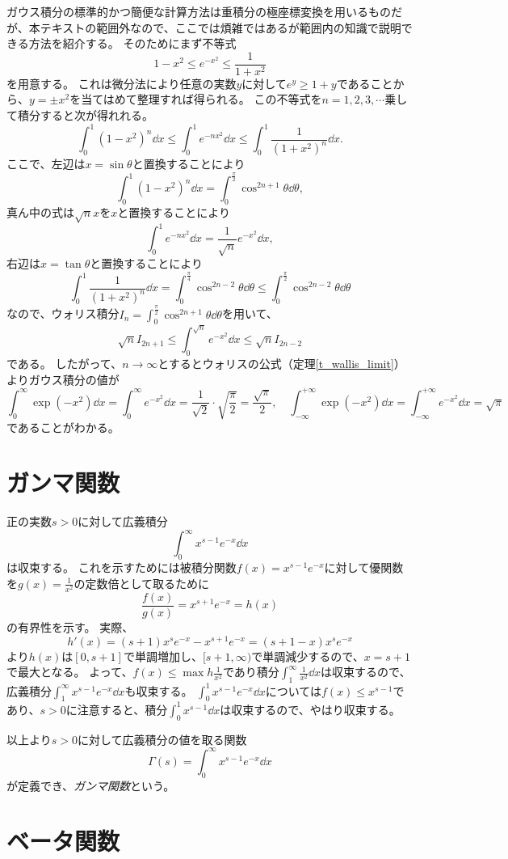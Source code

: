 ガウス積分の標準的かつ簡便な計算方法は重積分の極座標変換を用いるものだが、本テキストの範囲外なので、ここでは煩雑ではあるが範囲内の知識で説明できる方法を紹介する。
そのためにまず不等式
$$
1-x^2 \le e^{-x^2} \le \frac{1}{1+x^2}
$$
を用意する。
これは微分法により任意の実数$y$に対して$e^y \ge 1+y$であることから、$y = \pm x^2$を当てはめて整理すれば得られる。
この不等式を$n = 1, 2, 3, \cdots$乗して積分すると次が得れれる。
$$
\int_0^1 (1-x^2)^n\dd{x} \le \int_0^1 e^{-n x^2}\dd{x} \le \int_0^1 \frac{1}{(1+x^2)^n}\dd{x}.
$$
ここで、左辺は$x = \sin\theta$と置換することにより
$$
\int_0^1 (1-x^2)^n\dd{x} = \int_0^{\frac{\pi}{2}} \cos^{2 n+1}\theta\dd{\theta},
$$
真ん中の式は$\sqrt{n}x$を$x$と置換することにより
$$
\int_0^1 e^{-n x^2}\dd{x} = \frac{1}{\sqrt{n}} e^{-x^2}\dd{x},
$$
右辺は$x = \tan\theta$と置換することにより
$$
\int_0^1 \frac{1}{(1+x^2)^n}\dd{x} = \int_0^{\frac{\pi}{4}} \cos^{2 n-2}\theta\dd{\theta} \le \int_0^{\frac{\pi}{2}} \cos^{2 n-2}\theta\dd{\theta}
$$
なので、ウォリス積分$I_n = \int_0^{\frac{\pi}{2}} \cos^{2 n+1}\theta\dd{\theta}$を用いて、
$$
\sqrt{n}I_{2 n+1} \le \int_0^{\sqrt{n}} e^{-x^2}\dd{x} \le \sqrt{n}I_{2 n-2}
$$
である。
したがって、$n \to \infty$とするとウォリスの公式（定理\ref{t_wallis_limit}）よりガウス積分の値が
$$
\int_0^\infty \exp(-x^2)\dd{x} = \int_0^\infty e^{-x^2}\dd{x} = \frac{1}{\sqrt{2}}\cdot\sqrt{\frac{\pi}{2}} = \frac{\sqrt{\pi}}{2},
\quad \int_{-\infty}^{+\infty} \exp(-x^2)\dd{x} = \int_{-\infty}^{+\infty} e^{-x^2}\dd{x} = \sqrt{\pi}
$$
であることがわかる。

\section{ガンマ関数}

正の実数$s > 0$に対して広義積分
$$
\int_0^\infty x^{s-1}e^{-x}\dd{x}
$$
は収束する。
これを示すためには被積分関数$f(x) = x^{s-1}e^{-x}$に対して優関数を$g(x) = \frac{1}{x^2}$の定数倍として取るために
$$
\frac{f(x)}{g(x)} = x^{s+1}e^{-x} = h(x)
$$
の有界性を示す。
実際、
$$
h'(x) = (s+1)x^s e^{-x}-x^{s+1}e^{-x} = (s+1-x)x^s e^{-x}
$$
より$h(x)$は$[0, s+1]$で単調増加し、$[s+1, \infty)$で単調減少するので、$x = s+1$で最大となる。
よって、$f(x) \le \max h \frac{1}{x^2}$であり積分$\int_1^\infty \frac{1}{x^2}\dd{x}$は収束するので、広義積分$\int_1^\infty x^{s-1}e^{-x}\dd{x}$も収束する。
$\int_0^1 x^{s-1}e^{-x}\dd{x}$については$f(x) \le x^{s-1}$であり、$s > 0$に注意すると、積分$\int_0^1 x^{s-1}\dd{x}$は収束するので、やはり収束する。

以上より$s > 0$に対して広義積分の値を取る関数
$$
\Gamma(s) = \int_0^\infty x^{s-1}e^{-x}\dd{x}
$$
が定義でき、\emph{ガンマ関数}という。

\section{ベータ関数}
